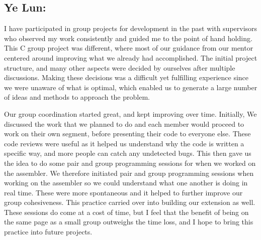\documentclass[a4paper]{article}
\begin{document}
\subsection{Ye Lun:}
I have participated in group projects for development in the past with supervisors who observed my work consistently and guided me to the point of hand holding. This C group project was different, where most of our guidance from our mentor centered around improving what we already had accomplished. The initial project structure, and many other aspects were decided by ourselves after multiple discussions. Making these decisions was a difficult yet fulfilling experience since we were unaware of what is optimal, which enabled us to generate a large number of ideas and methods to approach the problem.

Our group coordination started great, and kept improving over time. Initially, We discussed the work that we planned to do and each member would proceed to work on their own segment, before presenting their code to everyone else. These code reviews were useful as it helped us understand why the code is written a specific way, and more people can catch any undetected bugs. This then gave us the idea to do some pair and group programming sessions for when we worked on the assembler. We therefore initiated pair and group programming sessions when working on the assembler so we could understand what one another is doing in real time. These were more spontaneous and it helped to further improve our group cohesiveness. This practice carried over into building our extension as well. These sessions do come at a cost of time, but I feel that the benefit of being on the same page as a small group outweighs the time loss, and I hope to bring this practice into future projects.
\end{document}
